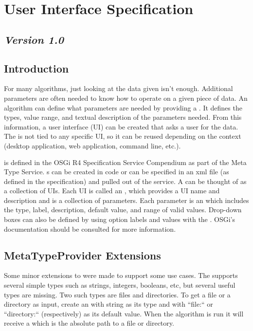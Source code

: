 \section{User Interface Specification}
\label{GUISpec}
\subsection*{\textit{Version 1.0}}
\subsection{Introduction}

For many algorithms, just looking at the data given isn't enough. Additional
parameters are often needed to know how to operate on a given piece of data. An
algorithm can define what parameters are needed by providing a
. It defines the types, value range, and textual
description of the parameters needed. From this information, a user interface
(UI) can be created that asks a user for the data. The 
is not tied to any specific UI, so it can be reused depending on the context
(desktop application, web application, command line, etc.).

 is defined in the OSGi R4 Specification Service
Compendium as part of the Meta Type Service. s can be
created in code or can be specified in an xml file (as defined in the
specification) and pulled out of the  service. A
 can be thought of as a collection of UIs. Each UI is
called an , which provides a UI name and
description and is a collection of parameters. Each parameter is an
 which includes the type, label, description, default
value, and range of valid values. Drop-down boxes can also be defined by using
option labels and values with the . OSGi's
documentation should be consulted for more information.

\subsection{MetaTypeProvider Extensions}

Some minor extensions to  were made to support some
use cases. The  supports several simple types such as
strings, integers, booleans, etc, but several useful types are missing. Two
such types are files and directories. To get a file or a directory as input,
create an  with string as its type and with ``file:``
or ``directory:`` (respectively) as its default value. When the algorithm is
run it will receive a  which is the absolute path to a file or
directory.
